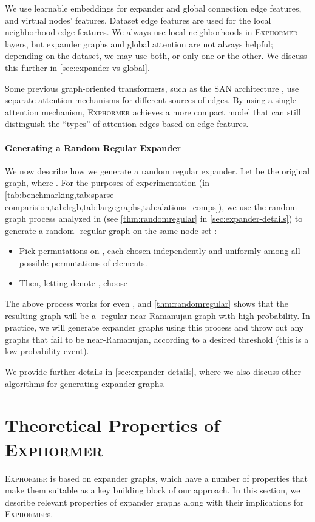 \documentclass{article}
\theoremstyle{plain}
\theoremstyle{definition}
\theoremstyle{remark}
\begin{document}
We use learnable embeddings for expander and global connection edge features, and virtual nodes' features. Dataset edge features are used for the local neighborhood edge features.
We always use local neighborhoods in \textsc{Exphormer} layers, but expander graphs and global attention are not always helpful; depending on the dataset, we may use both, or only one or the other.
We discuss this further in \cref{sec:expander-vs-global}.

Some previous graph-oriented transformers,
such as the SAN architecture \citep{kreuzer2021rethinking},
use separate attention mechanisms for different sources of edges.
By using a single attention mechanism,
\textsc{Exphormer} achieves a more compact model
that can still distinguish the ``types'' of attention edges based on edge features.


\paragraph{Generating a Random Regular Expander}
We now describe how we generate a random regular expander. Let  be the original graph, where . For the purposes of experimentation (in \cref{tab:benchmarking,tab:sparse-comparision,tab:lrgb,tab:largegraphs,tab:alations_comps}), we use the random graph process analyzed in \citet{Friedman03} (see \cref{thm:randomregular} in \cref{sec:expander-details}) to generate a random -regular graph  on the same node set :
\begin{itemize}[itemsep=2pt,parsep=2pt]
    \item Pick  permutations  on , each  chosen independently and uniformly among all possible permutations of  elements.
    \item Then, letting  denote , choose
    
\end{itemize}
The above process works for even , and \cref{thm:randomregular} shows that the resulting graph will be a -regular near-Ramanujan graph with high probability. In practice, we will generate expander graphs using this process and throw out any graphs that fail to be near-Ramanujan, according to a desired threshold (this is a low probability event).

We provide further details in \cref{sec:expander-details}, where we also discuss other algorithms for generating expander graphs.






\section{Theoretical Properties of \textsc{Exphormer}} \label{sec:theoreticalprop}
\textsc{Exphormer} is based on expander graphs, which have a number of properties that make them suitable as a key building block of our approach. In this section, we describe relevant properties of expander graphs along with their implications for \textsc{Exphormer}s.
\end{document}
